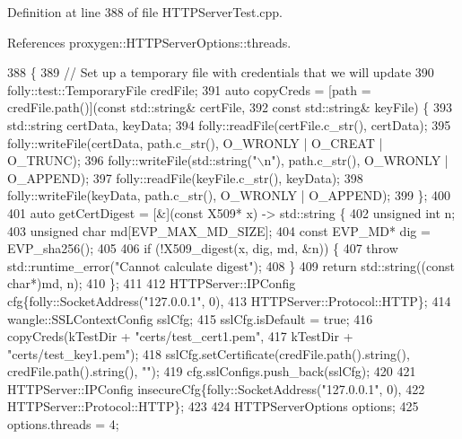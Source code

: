 Definition at line 388 of file H\+T\+T\+P\+Server\+Test.\+cpp.



References proxygen\+::\+H\+T\+T\+P\+Server\+Options\+::threads.


\begin{DoxyCode}
388                                     \{
389   \textcolor{comment}{// Set up a temporary file with credentials that we will update}
390   folly::test::TemporaryFile credFile;
391   \textcolor{keyword}{auto} copyCreds = [path = credFile.path()](\textcolor{keyword}{const} std::string& certFile,
392                                         \textcolor{keyword}{const} std::string& keyFile) \{
393     std::string certData, keyData;
394     folly::readFile(certFile.c\_str(), certData);
395     folly::writeFile(certData, path.c\_str(), O\_WRONLY | O\_CREAT | O\_TRUNC);
396     folly::writeFile(std::string(\textcolor{stringliteral}{"\(\backslash\)n"}), path.c\_str(), O\_WRONLY | O\_APPEND);
397     folly::readFile(keyFile.c\_str(), keyData);
398     folly::writeFile(keyData, path.c\_str(), O\_WRONLY | O\_APPEND);
399   \};
400 
401   \textcolor{keyword}{auto} getCertDigest = [&](\textcolor{keyword}{const} X509* x) -> std::string \{
402     \textcolor{keywordtype}{unsigned} \textcolor{keywordtype}{int} n;
403     \textcolor{keywordtype}{unsigned} \textcolor{keywordtype}{char} md[EVP\_MAX\_MD\_SIZE];
404     \textcolor{keyword}{const} EVP\_MD* dig = EVP\_sha256();
405 
406     \textcolor{keywordflow}{if} (!X509\_digest(x, dig, md, &n)) \{
407       \textcolor{keywordflow}{throw} std::runtime\_error(\textcolor{stringliteral}{"Cannot calculate digest"});
408     \}
409     \textcolor{keywordflow}{return} std::string((\textcolor{keyword}{const} \textcolor{keywordtype}{char}*)md, n);
410   \};
411 
412   HTTPServer::IPConfig cfg\{folly::SocketAddress(\textcolor{stringliteral}{"127.0.0.1"}, 0),
413                            HTTPServer::Protocol::HTTP\};
414   wangle::SSLContextConfig sslCfg;
415   sslCfg.isDefault = \textcolor{keyword}{true};
416   copyCreds(kTestDir + \textcolor{stringliteral}{"certs/test\_cert1.pem"},
417             kTestDir + \textcolor{stringliteral}{"certs/test\_key1.pem"});
418   sslCfg.setCertificate(credFile.path().string(), credFile.path().string(), \textcolor{stringliteral}{""});
419   cfg.sslConfigs.push\_back(sslCfg);
420 
421   HTTPServer::IPConfig insecureCfg\{folly::SocketAddress(\textcolor{stringliteral}{"127.0.0.1"}, 0),
422                                    HTTPServer::Protocol::HTTP\};
423 
424   HTTPServerOptions options;
425   options.threads = 4;

\end{DoxyCode}

